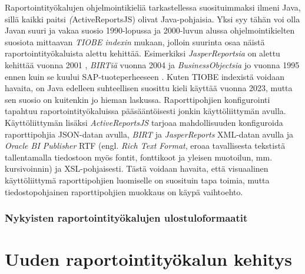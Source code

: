 Raportointityökalujen ohjelmointikieliä tarkastellessa suosituimmaksi ilmeni Java, sillä kaikki paitsi \textit(ActiveReportsJS) olivat Java-pohjaisia. Yksi syy tähän voi olla Javan suuri ja vakaa suosio 1990-lopussa ja 2000-luvun alussa ohjelmointikielten suosiota mittaavan \textit{TIOBE indexin} mukaan\cite{noauthor_tiobe_nodate}, jolloin suurinta osaa näistä raportointityökaluista alettu kehittää. Esimerkiksi \textit{JasperReportsia} on alettu kehittää vuonna 2001 \cite{noauthor_origin_2006}, \textit{BIRTiä} vuonna 2004 \cite{noauthor_eclipse_2004} ja \textit{BusinessObjectsia} jo vuonna 1995 ennen kuin se kuului SAP-tuoteperheeseen \cite{alma9922048891805971}. Kuten {TIOBE indexistä} voidaan havaita, on Java edelleen suhteellisen suosittu kieli käyttää vuonna 2023, mutta sen suosio on kuitenkin jo hieman laskussa. Raporttipohjien konfigurointi tapahtuu raportointityökaluissa pääsääntöisesti jonkin käyttöliittymän avulla. Käyttöliittymän lisäksi \textit{ActiveReportsJS} tarjoaa mahdollisuuden konfiguroida raporttipohjia JSON-datan avulla, \textit{BIRT} ja  \textit{JasperReports} XML-datan avulla ja \textit{Oracle BI Publisher} RTF (engl. \textit{Rich Text Format}, eroaa tavallisesta tekstistä tallentamalla tiedostoon myös fontit, fonttikoot ja yleisen muotoilun, mm. kursivoinnin) ja XSL-pohjaisesti. Tästä voidaan havaita, että visuaalinen käyttöliittymä raporttipohjien luomiselle on suosituin tapa toimia, mutta tiedostopohjainen raporttipohjien muokkaus on käypä vaihtoehto.

\subsubsection{Nykyisten raportointityökalujen ulostuloformaatit}

\section{Uuden raportointityökalun kehitys}

